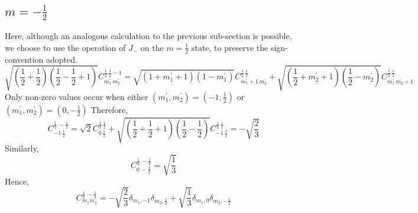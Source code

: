 \documentclass{article}
\begin{document}
\subsection*{$m=-\frac{1}{2}$}
Here, although an analogous calculation to the previous sub-section is possible, we choose to use the operation of $J_{-}$ on the $m=\frac{1}{2}$ state, to preserve the sign-convention adopted.
$$ \sqrt{(\frac{1}{2}+\frac{1}{2})(\frac{1}{2}-\frac{1}{2}+1)} C^{\frac{1}{2} \, \frac{1}{2}-1}_{m^{\prime}_{1} \, m^{\prime}_{2}} = \sqrt{(1+m^{\prime}_{1}+1)(1-m^{\prime}_{1})} C^{\frac{1}{2} \, \frac{1}{2}}_{m^{\prime}_{1}+1 \, m^{\prime}_{2}} + \sqrt{(\frac{1}{2}+m^{\prime}_{2}+1)(\frac{1}{2}-m^{\prime}_{2})} C^{\frac{1}{2} \, \frac{1}{2}}_{m^{\prime}_{1} \, m^{\prime}_{2}+1}$$
Only non-zero values occur when either $(m^{\prime}_{1},m^{\prime}_{2})=(-1,\frac{1}{2})$ or $(m^{\prime}_{1},m^{\prime}_{2})=(0,-\frac{1}{2})$
Therefore, 
$$ C^{\frac{1}{2} \, -\frac{1}{2}}_{-1 \,\frac{1}{2}} = \sqrt{2} C^{\frac{1}{2} \, \frac{1}{2}}_{0 \, \frac{1}{2}} + \sqrt{(\frac{1}{2}+\frac{1}{2}+1)(\frac{1}{2}-\frac{1}{2})} C^{\frac{1}{2} \, \frac{1}{2}}_{-1 \, \frac{3}{2}} = -\sqrt{\frac{2}{3}}$$
Similarly,
$$ C^{\frac{1}{2} \, -\frac{1}{2}}_{0 \,-\frac{1}{2}} = \sqrt{\frac{1}{3}}$$
Hence,
$$C^{\frac{1}{2} \, -\frac{1}{2}}_{m_{1} m_{2}} = -\sqrt{\frac{2}{3}} \delta_{m_{1},-1}\delta_{m_{2},\frac{1}{2}} + \sqrt{\frac{1}{3}}\delta_{m_{1},0}\delta_{m_{2},-\frac{1}{2}}$$
\end{document}

